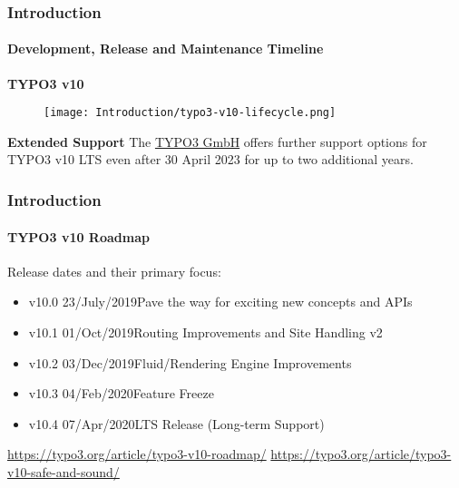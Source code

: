
\begin{frame}[fragile]
	\frametitle{Introduction}
	\framesubtitle{Development, Release and Maintenance Timeline}

	\textbf{TYPO3 v10}

	\begin{figure}
		\texttt{[image: Introduction/typo3-v10-lifecycle.png]}
	\end{figure}

	\textbf{Extended Support}\newline
	\smaller
		The \href{https://typo3.com}{TYPO3 GmbH} offers further support options
		for TYPO3 v10 LTS even after 30 April 2023 for up to two additional
		years.
	\normalsize

\end{frame}


\begin{frame}[fragile]
	\frametitle{Introduction}
	\framesubtitle{TYPO3 v10 Roadmap}

	Release dates and their primary focus:

	\begin{itemize}

		\item v10.0 \tabto{1.1cm}23/July/2019\tabto{3.4cm}Pave the way for exciting new concepts and APIs
		\item v10.1 \tabto{1.1cm}01/Oct/2019\tabto{3.4cm}Routing Improvements and Site Handling v2
		\item
			\begingroup
				\color{typo3orange}
				v10.2 \tabto{1.1cm}03/Dec/2019\tabto{3.4cm}Fluid/Rendering Engine Improvements
			\endgroup
		\item v10.3 \tabto{1.1cm}04/Feb/2020\tabto{3.4cm}Feature Freeze
		\item v10.4 \tabto{1.1cm}07/Apr/2020\tabto{3.4cm}LTS Release (Long-term Support)

	\end{itemize}

	\smaller
		\url{https://typo3.org/article/typo3-v10-roadmap/}\newline
		\url{https://typo3.org/article/typo3-v10-safe-and-sound/}
	\normalsize

\end{frame}

